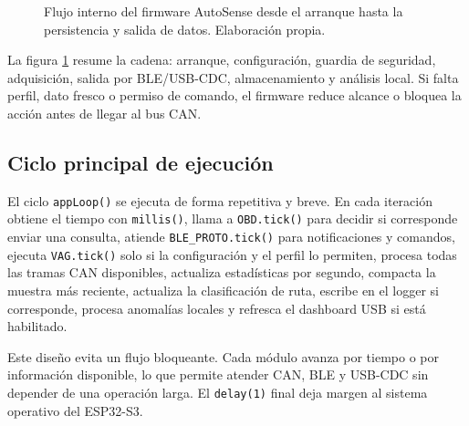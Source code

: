\documentclass[12pt,letterpaper]{report}
\begin{document}
\begin{figure}[!htbp]
{
}
\endgroup
    \caption{Flujo interno del firmware AutoSense desde el arranque hasta la persistencia y salida de datos. Elaboración propia.}
\label{fig:firmware-flujo-general}
\end{figure}

La figura \ref{fig:firmware-flujo-general} resume la cadena: arranque, configuración, guardia de seguridad, adquisición, salida por BLE/USB-CDC, almacenamiento y análisis local. Si falta perfil, dato fresco o permiso de comando, el firmware reduce alcance o bloquea la acción antes de llegar al bus CAN.

\subsection{Ciclo principal de ejecución}

El ciclo \texttt{appLoop()} se ejecuta de forma repetitiva y breve. En cada iteración obtiene el tiempo con \texttt{millis()}, llama a \texttt{OBD.tick()} para decidir si corresponde enviar una consulta, atiende \texttt{BLE\_PROTO.tick()} para notificaciones y comandos, ejecuta \texttt{VAG.tick()} solo si la configuración y el perfil lo permiten, procesa todas las tramas CAN disponibles, actualiza estadísticas por segundo, compacta la muestra más reciente, actualiza la clasificación de ruta, escribe en el logger si corresponde, procesa anomalías locales y refresca el dashboard USB si está habilitado.

Este diseño evita un flujo bloqueante. Cada módulo avanza por tiempo o por información disponible, lo que permite atender CAN, BLE y USB-CDC sin depender de una operación larga. El \texttt{delay(1)} final deja margen al sistema operativo del ESP32-S3.
\end{document}
